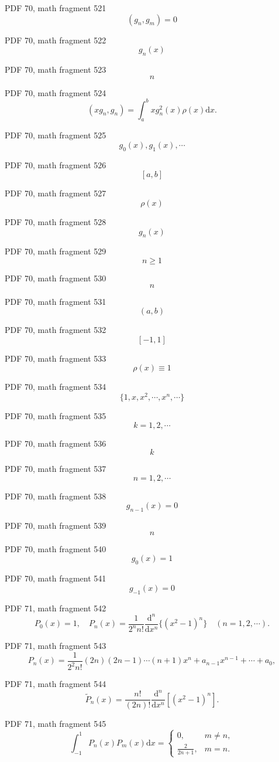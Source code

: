 \documentclass[UTF8,fontset=fandol]{ctexart}
\begin{document}
PDF 70, math fragment 521
\[(g_n, g_m) = 0\]
\par
PDF 70, math fragment 522
\[g_n(x)\]
\par
PDF 70, math fragment 523
\[n\]
\par
PDF 70, math fragment 524
\[(xg_n, g_n) = \int_a^b xg_n^2(x) \rho(x) \mathrm{d}x.\]
\par
PDF 70, math fragment 525
\[g_0(x), g_1(x), \cdots\]
\par
PDF 70, math fragment 526
\[[a, b]\]
\par
PDF 70, math fragment 527
\[\rho(x)\]
\par
PDF 70, math fragment 528
\[g_n(x)\]
\par
PDF 70, math fragment 529
\[n \geq 1\]
\par
PDF 70, math fragment 530
\[n\]
\par
PDF 70, math fragment 531
\[(a, b)\]
\par
PDF 70, math fragment 532
\[[-1, 1]\]
\par
PDF 70, math fragment 533
\[\rho(x) \equiv 1\]
\par
PDF 70, math fragment 534
\[\{1, x, x^2, \cdots, x^n, \cdots\}\]
\par
PDF 70, math fragment 535
\[k=1,2,\cdots\]
\par
PDF 70, math fragment 536
\[k\]
\par
PDF 70, math fragment 537
\[n=1,2,\cdots\]
\par
PDF 70, math fragment 538
\[g_{n-1}(x)=0\]
\par
PDF 70, math fragment 539
\[n\]
\par
PDF 70, math fragment 540
\[g_0(x)=1\]
\par
PDF 70, math fragment 541
\[g_{-1}(x)=0\]
\par
PDF 71, math fragment 542
\[
P_0(x) = 1, \quad P_n(x) = \frac{1}{2^n n!} \frac{\mathrm{d}^n}{\mathrm{d}x^n} \{(x^2 - 1)^n\} \quad (n = 1, 2, \cdots). \tag{3.4.1}
\]
\par
PDF 71, math fragment 543
\[
P_n(x) = \frac{1}{2^2 n!} (2n)(2n - 1) \cdots (n + 1)x^n + a_{n-1}x^{n-1} + \cdots + a_0,
\]
\par
PDF 71, math fragment 544
\[
\tilde{P}_n(x) = \frac{n!}{(2n)!} \frac{\mathrm{d}^n}{\mathrm{d}x^n} [(x^2 - 1)^n]. \tag{3.4.2}
\]
\par
PDF 71, math fragment 545
\[
\int_{-1}^{1} P_n(x) P_m(x) \mathrm{d}x = \begin{cases} 0, & m \neq n, \\ \frac{2}{2n + 1}, & m = n. \end{cases} \tag{3.4.3}
\]
\end{document}
